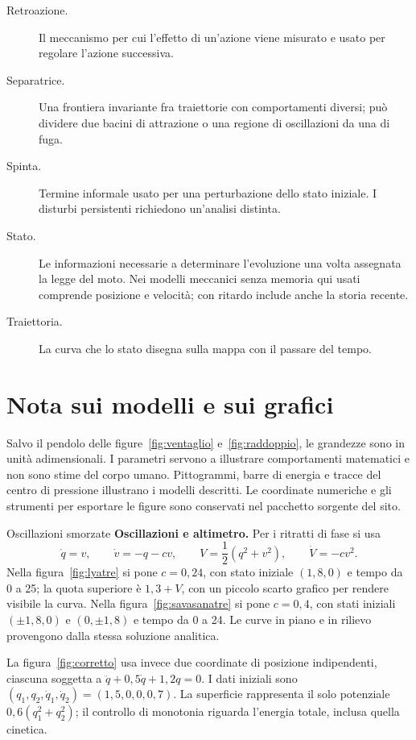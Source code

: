 \documentclass[11pt]{article}
\begin{document}
{\begin{description}
\item[Retroazione.] Il meccanismo per cui l'effetto di un'azione viene misurato e usato per regolare l'azione successiva.
\item[Separatrice.] Una frontiera invariante fra traiettorie con comportamenti diversi; può dividere due bacini di attrazione o una regione di oscillazioni da una di fuga.
\item[Spinta.] Termine informale usato per una perturbazione dello stato iniziale. I disturbi persistenti richiedono un'analisi distinta.
\item[Stato.] Le informazioni necessarie a determinare l'evoluzione una volta assegnata la legge del moto. Nei modelli meccanici senza memoria qui usati comprende posizione e velocità; con ritardo include anche la storia recente.
\item[Traiettoria.] La curva che lo stato disegna sulla mappa con il passare del tempo.
\end{description}}

\section*{Nota sui modelli e sui grafici}

Salvo il pendolo delle figure~\ref{fig:ventaglio} e~\ref{fig:raddoppio}, le grandezze sono in unità adimensionali. I parametri servono a illustrare comportamenti matematici e non sono stime del corpo umano. Pittogrammi, barre di energia e tracce del centro di pressione illustrano i modelli descritti. Le coordinate numeriche e gli strumenti per esportare le figure sono conservati nel pacchetto sorgente del sito.

\begin{formule}{Oscillazioni smorzate}
\textbf{Oscillazioni e altimetro.} Per i ritratti di fase si usa
\[
 \dot q=v,\qquad \dot v=-q-cv,\qquad
 V=\frac{1}{2}(q^2+v^2),\qquad \dot V=-cv^2.
\]
Nella figura~\ref{fig:lyatre} si pone $c=0{,}24$, con stato iniziale $(1{,}8,0)$ e tempo da 0 a 25; la quota superiore è $1{,}3+V$, con un piccolo scarto grafico per rendere visibile la curva. Nella figura~\ref{fig:savasanatre} si pone $c=0{,}4$, con stati iniziali $(\pm1{,}8,0)$ e $(0,\pm1{,}8)$ e tempo da 0 a 24. Le curve in piano e in rilievo provengono dalla stessa soluzione analitica.

La figura~\ref{fig:corretto} usa invece due coordinate di posizione indipendenti, ciascuna soggetta a $\ddot q+0{,}5\dot q+1{,}2q=0$. I dati iniziali sono $(q_1,q_2,\dot q_1,\dot q_2)=(1{,}5,0,0,0{,}7)$. La superficie rappresenta il solo potenziale $0{,}6(q_1^2+q_2^2)$; il controllo di monotonia riguarda l'energia totale, inclusa quella cinetica.
\end{formule}
\end{document}
